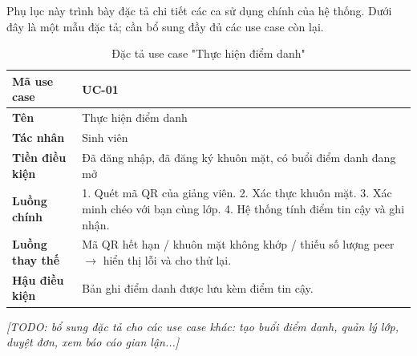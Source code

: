 \documentclass[../main.tex]{subfiles}
\begin{document}

Phụ lục này trình bày đặc tả chi tiết các ca sử dụng chính của hệ thống. Dưới đây là một mẫu đặc tả; cần bổ sung đầy đủ các use case còn lại.

\begin{table}[H]
\centering
\caption{Đặc tả use case "Thực hiện điểm danh"}
\label{tab:uc_diemdanh}
\begin{tabularx}{\linewidth}{|l|X|}
\hline
\textbf{Mã use case} & UC-01 \\ \hline
\textbf{Tên} & Thực hiện điểm danh \\ \hline
\textbf{Tác nhân} & Sinh viên \\ \hline
\textbf{Tiền điều kiện} & Đã đăng nhập, đã đăng ký khuôn mặt, có buổi điểm danh đang mở \\ \hline
\textbf{Luồng chính} & 1. Quét mã QR của giảng viên. 2. Xác thực khuôn mặt. 3. Xác minh chéo với bạn cùng lớp. 4. Hệ thống tính điểm tin cậy và ghi nhận. \\ \hline
\textbf{Luồng thay thế} & Mã QR hết hạn / khuôn mặt không khớp / thiếu số lượng peer $\rightarrow$ hiển thị lỗi và cho thử lại. \\ \hline
\textbf{Hậu điều kiện} & Bản ghi điểm danh được lưu kèm điểm tin cậy. \\ \hline
\end{tabularx}
\end{table}

\textit{[TODO: bổ sung đặc tả cho các use case khác: tạo buổi điểm danh, quản lý lớp, duyệt đơn, xem báo cáo gian lận...]}
\end{document}
